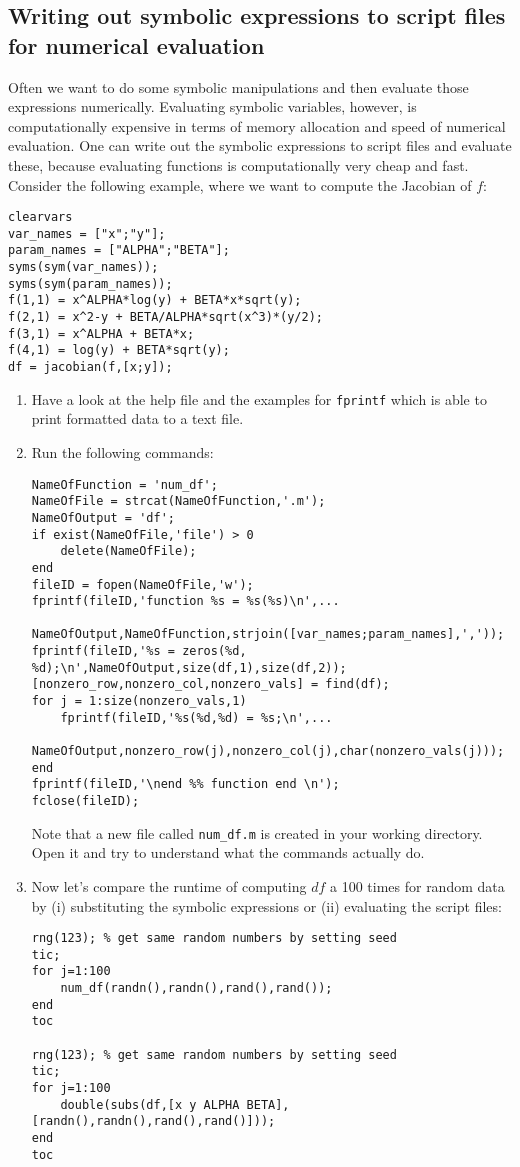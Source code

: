 \subsection*{Writing out symbolic expressions to script files for numerical evaluation}
Often we want to do some symbolic manipulations and then evaluate those expressions numerically.
Evaluating symbolic variables, however, is computationally expensive in terms of memory allocation and speed of numerical evaluation.
One can write out the symbolic expressions to script files and evaluate these,
  because evaluating functions is computationally very cheap and fast.
Consider the following example, where we want to compute the Jacobian of $f$:
\begin{lstlisting}[style=Matlab-editor,basicstyle=\mlttfamily\scriptsize]
clearvars
var_names = ["x";"y"];
param_names = ["ALPHA";"BETA"];
syms(sym(var_names));
syms(sym(param_names));
f(1,1) = x^ALPHA*log(y) + BETA*x*sqrt(y);
f(2,1) = x^2-y + BETA/ALPHA*sqrt(x^3)*(y/2);
f(3,1) = x^ALPHA + BETA*x;
f(4,1) = log(y) + BETA*sqrt(y);
df = jacobian(f,[x;y]);
\end{lstlisting}

\newpage
\begin{enumerate}[resume]
  \item Have a look at the help file and the examples for \texttt{fprintf} which is able to print formatted data to a text file.
  \item Run the following commands:
\begin{lstlisting}[style=Matlab-editor,basicstyle=\mlttfamily\scriptsize]
NameOfFunction = 'num_df';
NameOfFile = strcat(NameOfFunction,'.m');
NameOfOutput = 'df';
if exist(NameOfFile,'file') > 0
    delete(NameOfFile);
end
fileID = fopen(NameOfFile,'w');
fprintf(fileID,'function %s = %s(%s)\n',...
          NameOfOutput,NameOfFunction,strjoin([var_names;param_names],','));    
fprintf(fileID,'%s = zeros(%d, %d);\n',NameOfOutput,size(df,1),size(df,2));
[nonzero_row,nonzero_col,nonzero_vals] = find(df);
for j = 1:size(nonzero_vals,1)
    fprintf(fileID,'%s(%d,%d) = %s;\n',... 
          NameOfOutput,nonzero_row(j),nonzero_col(j),char(nonzero_vals(j)));
end
fprintf(fileID,'\nend %% function end \n');
fclose(fileID);
\end{lstlisting}
  Note that a new file called \texttt{num\_df.m} is created in your working directory.
  Open it and try to understand what the commands actually do.
  \item Now let's compare the runtime of computing $df$ a 100 times for random data by
  (i) substituting the symbolic expressions or (ii) evaluating the script files:
\begin{lstlisting}[style=Matlab-editor,basicstyle=\mlttfamily\scriptsize]
rng(123); % get same random numbers by setting seed
tic;
for j=1:100
    num_df(randn(),randn(),rand(),rand());
end
toc
  
rng(123); % get same random numbers by setting seed
tic;
for j=1:100
    double(subs(df,[x y ALPHA BETA],[randn(),randn(),rand(),rand()]));
end
toc
\end{lstlisting}
\end{enumerate}

